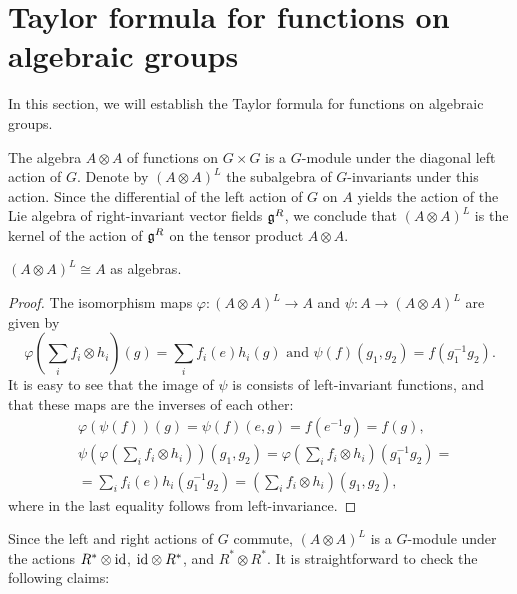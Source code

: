 \documentclass[12pt]{amsart}
\begin{document}
\section{Taylor formula for functions on algebraic groups}

In this section, we will establish the Taylor formula for functions on algebraic groups.

The algebra $A \otimes A$ of functions on $G \times G$ is a $G$-module under the diagonal left action of $G$. Denote by $(A \otimes A)^L$ the subalgebra of $G$-invariants under this action. Since the differential of the left action of $G$ on $A$ yields the action of the Lie algebra of right-invariant vector fields $\mathfrak{g}^R$, we conclude that $(A \otimes A)^L$ is the kernel of the action of $\mathfrak{g}^R$ on the tensor product $A \otimes A$.

\begin{lemma}
$(A \otimes A)^L \cong A$ as algebras. 
\end{lemma}
\begin{proof}
The isomorphism maps $\varphi: (A \otimes A)^L \rightarrow A$ and $\psi: A \rightarrow  (A \otimes A)^L$ are given by
$$\varphi\left( \sum_i f_i \otimes h_i \right) (g) = \sum_i f_i (e) h_i (g) \text{\ \ and \ }
\psi(f) (g_1, g_2) = f(g_1^{-1} g_2).$$  
It is easy to see that the image of $\psi$ is consists of left-invariant functions, and that these maps are the inverses of each other:
\begin{align*}
&\varphi(\psi(f)) (g) = \psi(f) (e, g) = f(e^{-1} g) = f(g), \\
&\psi\left( \varphi\left( \sum_i f_i \otimes h_i \right) \right) (g_1, g_2)
= \varphi\left( \sum_i f_i \otimes h_i \right) (g_1^{-1} g_2) = \\
&= \sum_i f_i (e) h_i (g_1^{-1} g_2)
= \left( \sum_i f_i \otimes h_i \right) (g_1, g_2),
\end{align*}
where in the last equality follows from left-invariance.
\end{proof}

Since the left and right actions of $G$ commute, $(A \otimes A)^L$ is a $G$-module under the actions $R^* \otimes \textup{id}$, $\textup{id} \otimes R^*$, and  $R^* \otimes R^*$. It is straightforward to check the following claims:
\end{document}
